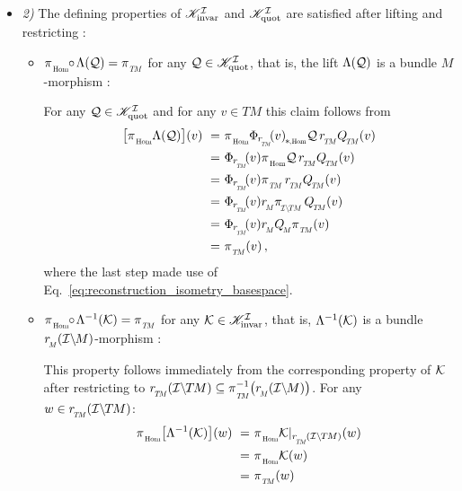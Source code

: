 \begin{itemize}[leftmargin=0cm]
\begin{itemize}[leftmargin=1.1cm]
    \end{itemize}







    \item[] {\emph{2)} The defining properties of $\mathscr{K}_\textup{invar}^{\mathcal{I}}$ and $\mathscr{K}_\textup{quot}^{\mathcal{I}}$ are satisfied after lifting and restricting : }

    \begin{itemize}[leftmargin=1.1cm]
    \setlength\itemsep{2ex}
        \item[\it 2\hspace{1pt}a)]
            $\piHom \mkern-5mu\circ\mkern-2mu \Lambda(\Q) = \piTM$ for any $\mathcal{Q} \in \mathscr{K}_\textup{quot}^{\mathcal{I}}$,
            that is, the lift $\Lambda(\mathcal{Q})$ is a bundle $M$-morphism :

            For any $\mathcal{Q}\in \mathscr{K}_\textup{quot}^{\mathcal{I}}$ and for any $v\in TM$ this claim follows from
            \begin{align}
                \big[ \piHom \Lambda(\Q) \big](v)
                \ =&\ \piHom \dPhirHom{v} \Q\, \rTM \QTM(v) \notag \\
                \ =&\ \Phir{v} \piHom \Q\, \rTM \QTM(v) \notag \\
                \ =&\ \Phir{v} \piTM\, \rTM \QTM(v) \notag \\
                \ =&\ \Phir{v} \rM \piITM\, \QTM(v) \notag \\
                \ =&\ \Phir{v} \rM \QM \piTM(v) \notag \\
                \ =&\ \piTM(v) \,,
            \end{align}
            where the last step made use of Eq.~\eqref{eq:reconstruction_isometry_basespace}.

        \item[\it 2\hspace{1pt}b)]
            ${\piHom \mkern-5mu\circ\mkern-2mu \Lambda^{-1}(\K) = \piTM}$ for any $\mathcal{K} \in \mathscr{K}_\textup{invar}^{\mathcal{I}}$,
            that is, $\Lambda^{-1}(\mathcal{K})$ is a bundle $\rM(\IM)$-morphism :

            This property follows immediately from the corresponding property of $\mathcal{K}$ after restricting to $\rTM(\ITM) \subseteq \piTM^{-1}\big(\rM(\IM)\big)$.
            For any $w \in \rTM(\ITM)$:
            \begin{align}
                \piHom \big[ \Lambda^{-1}(\K) \big](w)
                \ =&\ \piHom \Krestr(w) \notag \\
                \ =&\ \piHom \K(w) \notag \\
                \ =&\ \piTM(w) \notag \\
            \end{align}


\end{itemize}
\end{itemize}
